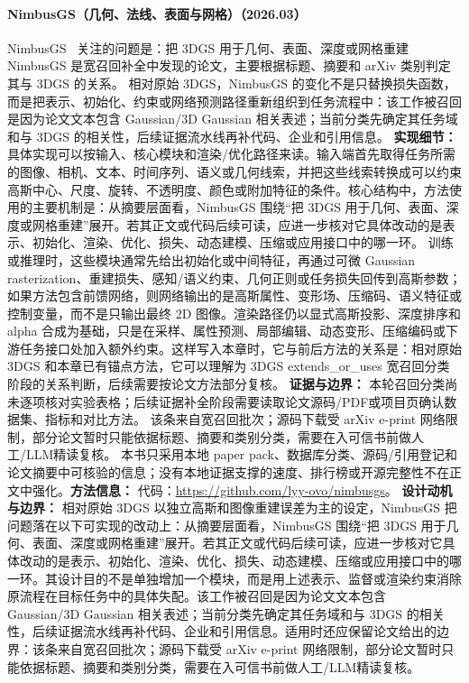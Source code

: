 \paragraph{NimbusGS（几何、法线、表面与网格）（2026.03）}
NimbusGS~\cite{2603_27228} 关注的问题是：把 3DGS 用于几何、表面、深度或网格重建 NimbusGS 是宽召回补全中发现的论文，主要根据标题、摘要和 arXiv 类别判定其与 3DGS 的关系。
相对原始 3DGS，NimbusGS 的变化不是只替换损失函数，而是把表示、初始化、约束或网络预测路径重新组织到任务流程中：该工作被召回是因为论文文本包含 Gaussian/3D Gaussian 相关表述；当前分类先确定其任务域和与 3DGS 的相关性，后续证据流水线再补代码、企业和引用信息。
\textbf{实现细节：} 具体实现可以按输入、核心模块和渲染/优化路径来读。输入端首先取得任务所需的图像、相机、文本、时间序列、语义或几何线索，并把这些线索转换成可以约束高斯中心、尺度、旋转、不透明度、颜色或附加特征的条件。核心结构中，方法使用的主要机制是：从摘要层面看，NimbusGS 围绕“把 3DGS 用于几何、表面、深度或网格重建”展开。若其正文或代码后续可读，应进一步核对它具体改动的是表示、初始化、渲染、优化、损失、动态建模、压缩或应用接口中的哪一环。 训练或推理时，这些模块通常先给出初始化或中间特征，再通过可微 Gaussian rasterization、重建损失、感知/语义约束、几何正则或任务损失回传到高斯参数；如果方法包含前馈网络，则网络输出的是高斯属性、变形场、压缩码、语义特征或控制变量，而不是只输出最终 2D 图像。渲染路径仍以显式高斯投影、深度排序和 alpha 合成为基础，只是在采样、属性预测、局部编辑、动态变形、压缩编码或下游任务接口处加入额外约束。这样写入本章时，它与前后方法的关系是：相对原始 3DGS 和本章已有锚点方法，它可以理解为 3DGS extends\_or\_uses 宽召回分类阶段的关系判断，后续需要按论文方法部分复核。
\textbf{证据与边界：} 本轮召回分类尚未逐项核对实验表格；后续证据补全阶段需要读取论文源码/PDF或项目页确认数据集、指标和对比方法。 该条来自宽召回批次；源码下载受 arXiv e-print 网络限制，部分论文暂时只能依据标题、摘要和类别分类，需要在入可信书前做人工/LLM精读复核。 本书只采用本地 paper pack、数据库分类、源码/引用登记和论文摘要中可核验的信息；没有本地证据支撑的速度、排行榜或开源完整性不在正文中强化。\textbf{方法信息：} 代码：\url{https://github.com/lyy-ovo/nimbusgs}。
\textbf{设计动机与边界：} 相对原始 3DGS 以独立高斯和图像重建误差为主的设定，NimbusGS 把问题落在以下可实现的改动上：从摘要层面看，NimbusGS 围绕“把 3DGS 用于几何、表面、深度或网格重建”展开。若其正文或代码后续可读，应进一步核对它具体改动的是表示、初始化、渲染、优化、损失、动态建模、压缩或应用接口中的哪一环。其设计目的不是单独增加一个模块，而是用上述表示、监督或渲染约束消除原流程在目标任务中的具体失配。该工作被召回是因为论文文本包含 Gaussian/3D Gaussian 相关表述；当前分类先确定其任务域和与 3DGS 的相关性，后续证据流水线再补代码、企业和引用信息。适用时还应保留论文给出的边界：该条来自宽召回批次；源码下载受 arXiv e-print 网络限制，部分论文暂时只能依据标题、摘要和类别分类，需要在入可信书前做人工/LLM精读复核。
